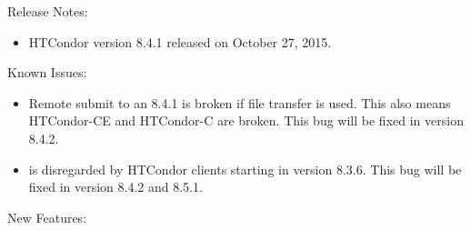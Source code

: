 \noindent Release Notes:

\begin{itemize}

\item HTCondor version 8.4.1 released on October 27, 2015.

\end{itemize}

\noindent Known Issues:
\begin{itemize}
\item Remote submit to an 8.4.1  is broken if file transfer is
used.  This also means HTCondor-CE and HTCondor-C are broken.  This bug will
be fixed in version 8.4.2.

\item {} is disregarded by HTCondor clients
starting in version 8.3.6.  This bug will be fixed in version 8.4.2 and 8.5.1.
\end{itemize}


\noindent New Features:

